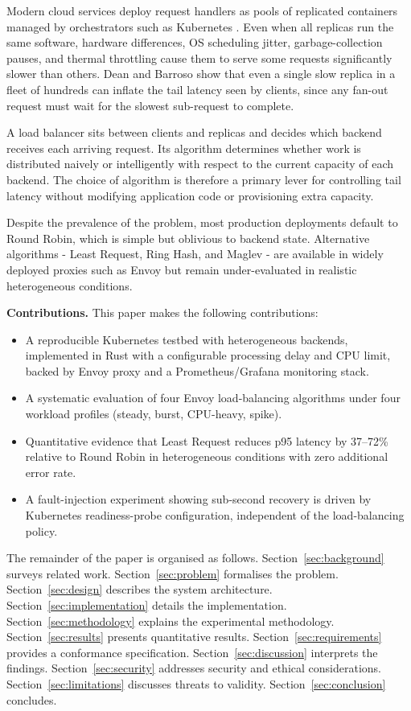 \documentclass[conference]{IEEEtran}
\begin{document}
Modern cloud services deploy request handlers as pools of replicated containers
managed by orchestrators such as Kubernetes \cite{burns2016borg}.
Even when all replicas run the same software, hardware differences, OS
scheduling jitter, garbage-collection pauses, and thermal throttling cause
them to serve some requests significantly slower than others.
Dean and Barroso \cite{dean2013tail} show that even a single slow replica in a
fleet of hundreds can inflate the tail latency seen by clients, since any
fan-out request must wait for the slowest sub-request to complete.

A load balancer sits between clients and replicas and decides which backend
receives each arriving request.
Its algorithm determines whether work is distributed naively or intelligently
with respect to the current capacity of each backend.
The choice of algorithm is therefore a primary lever for controlling tail
latency without modifying application code or provisioning extra capacity.

Despite the prevalence of the problem, most production deployments default to
Round Robin, which is simple but oblivious to backend state.
Alternative algorithms - Least Request, Ring Hash, and Maglev - are available in
widely deployed proxies such as Envoy \cite{envoyproxy,klein2017envoy} but
remain under-evaluated in realistic heterogeneous conditions.

\textbf{Contributions.} This paper makes the following contributions:
\begin{itemize}
  \item A reproducible Kubernetes testbed with heterogeneous backends,
        implemented in Rust with a configurable processing delay and CPU limit,
        backed by Envoy proxy and a Prometheus/Grafana monitoring stack.
  \item A systematic evaluation of four Envoy load-balancing algorithms under
        four workload profiles (steady, burst, CPU-heavy, spike).
  \item Quantitative evidence that Least Request reduces p95 latency by
        37--72\% relative to Round Robin in heterogeneous conditions with zero
        additional error rate.
  \item A fault-injection experiment showing sub-second recovery is driven by
        Kubernetes readiness-probe configuration, independent of the load-balancing
        policy.
\end{itemize}

The remainder of the paper is organised as follows.
Section~\ref{sec:background} surveys related work.
Section~\ref{sec:problem} formalises the problem.
Section~\ref{sec:design} describes the system architecture.
Section~\ref{sec:implementation} details the implementation.
Section~\ref{sec:methodology} explains the experimental methodology.
Section~\ref{sec:results} presents quantitative results.
Section~\ref{sec:requirements} provides a conformance specification.
Section~\ref{sec:discussion} interprets the findings.
Section~\ref{sec:security} addresses security and ethical considerations.
Section~\ref{sec:limitations} discusses threats to validity.
Section~\ref{sec:conclusion} concludes.
\end{document}
